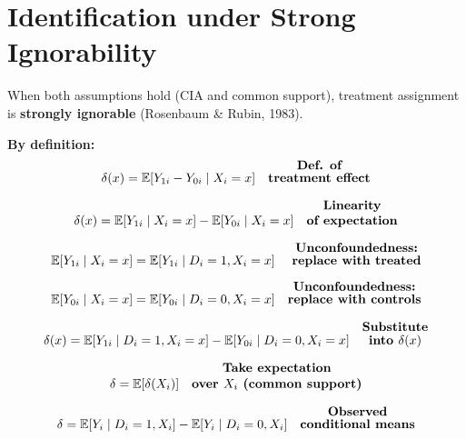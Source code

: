 \documentclass[12pt]{article}
\begin{document}
\section*{\noindent\textbf{Identification under Strong Ignorability}}

When both assumptions hold (CIA and common support), treatment assignment is \textbf{strongly ignorable} (Rosenbaum \& Rubin, 1983).

\textbf{By definition:}
\singlespacing
\begin{align}
\delta(x) 
  &= \mathbb{E}[Y_{1i} - Y_{0i} \mid X_i = x] 
  & \text{\textbf{\shortstack{Def. of \\ treatment effect}}}
\end{align}

\singlespacing
\begin{align}
\delta(x) 
  &= \mathbb{E}[Y_{1i} \mid X_i = x] - \mathbb{E}[Y_{0i} \mid X_i = x] 
  & \text{\textbf{\shortstack{Linearity \\ of expectation}}}
\end{align}

\singlespacing
\begin{align}
\mathbb{E}[Y_{1i} \mid X_i = x] 
  &= \mathbb{E}[Y_{1i} \mid D_i=1, X_i=x] 
  & \text{\textbf{\shortstack{Unconfoundedness: \\ replace with treated}}} \\[6pt]
\mathbb{E}[Y_{0i} \mid X_i = x] 
  &= \mathbb{E}[Y_{0i} \mid D_i=0, X_i=x] 
  & \text{\textbf{\shortstack{Unconfoundedness: \\ replace with controls}}}
\end{align}

\singlespacing
\begin{align}
\delta(x) 
  &= \mathbb{E}[Y_{1i} \mid D_i=1, X_i=x] 
     - \mathbb{E}[Y_{0i} \mid D_i=0, X_i=x] 
  & \text{\textbf{\shortstack{Substitute \\ into $\delta(x)$}}}
\end{align}

\singlespacing
\begin{align}
\delta 
  &= \mathbb{E}[\delta(X_i)] 
  & \text{\textbf{\shortstack{Take expectation \\ over $X_i$ (common support)}}}
\end{align}

\singlespacing
\begin{align}
\delta 
  &= \mathbb{E}[Y_i \mid D_i=1, X_i] 
     - \mathbb{E}[Y_i \mid D_i=0, X_i] 
  & \text{\textbf{\shortstack{Observed \\ conditional means}}}
\end{align}
\end{document}
